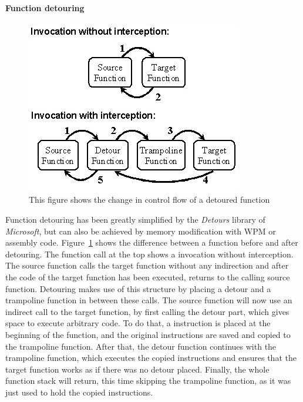 \paragraph{Function detouring}
\begin{figure}[h]
	\centering
	\includegraphics[keepaspectratio,width=.6\textwidth]{sections/background/attacks/fig_detours.png}
	\caption{This figure shows the change in control flow of a detoured function \cite{detours}}
	\label{fig:detours}
\end{figure}
Function detouring has been greatly simplified by the \emph{Detours} \cite{msdetours} library of \emph{Microsoft}, but can also be achieved by memory modification with \gls{WPM} or assembly code. Figure~\ref{fig:detours} shows the difference between a function before and after detouring. The function call at the top shows a invocation without interception. The source function calls the target function without any indirection and after the code of the target function has been executed, returns to the calling source function. Detouring makes use of this structure by placing a detour and a trampoline function in between these calls. The source function will now use an indirect call to the target function, by first calling the detour part, which gives space to execute arbitrary code. To do that, a  instruction is placed at the beginning of the function, and the original instructions are saved and copied to the trampoline function. After that, the detour function continues with the trampoline function, which executes the copied instructions and ensures that the target function works as if there was no detour placed. Finally, the whole function stack will return, this time skipping the trampoline function, as it was just used to hold the copied instructions.